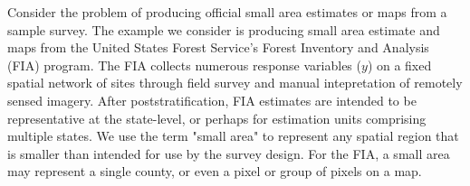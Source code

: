 \documentclass{article}
\begin{document}
Consider the problem of producing official small area estimates or maps from a sample survey.
The example we consider is producing small area estimate and maps from the United States Forest Service's Forest Inventory and Analysis (FIA) program.
The FIA collects numerous response variables ($y$) on a fixed spatial network of sites through field survey and manual intepretation of remotely sensed imagery.
After poststratification, FIA estimates are intended to be representative at the state-level, or perhaps for estimation units comprising multiple states.
We use the term "small area" to represent any spatial region that is smaller than intended for use by the survey design.
For the FIA, a small area may represent a single county, or even a pixel or group of pixels on a map.
\end{document}

